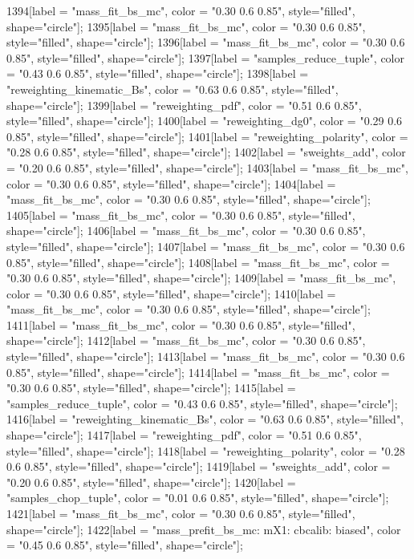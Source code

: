 {	1394[label = "mass_fit_bs_mc", color = "0.30 0.6 0.85", style="filled", shape="circle"];
	1395[label = "mass_fit_bs_mc", color = "0.30 0.6 0.85", style="filled", shape="circle"];
	1396[label = "mass_fit_bs_mc", color = "0.30 0.6 0.85", style="filled", shape="circle"];
	1397[label = "samples_reduce_tuple", color = "0.43 0.6 0.85", style="filled", shape="circle"];
	1398[label = "reweighting_kinematic_Bs", color = "0.63 0.6 0.85", style="filled", shape="circle"];
	1399[label = "reweighting_pdf", color = "0.51 0.6 0.85", style="filled", shape="circle"];
	1400[label = "reweighting_dg0", color = "0.29 0.6 0.85", style="filled", shape="circle"];
	1401[label = "reweighting_polarity", color = "0.28 0.6 0.85", style="filled", shape="circle"];
	1402[label = "sweights_add", color = "0.20 0.6 0.85", style="filled", shape="circle"];
	1403[label = "mass_fit_bs_mc", color = "0.30 0.6 0.85", style="filled", shape="circle"];
	1404[label = "mass_fit_bs_mc", color = "0.30 0.6 0.85", style="filled", shape="circle"];
	1405[label = "mass_fit_bs_mc", color = "0.30 0.6 0.85", style="filled", shape="circle"];
	1406[label = "mass_fit_bs_mc", color = "0.30 0.6 0.85", style="filled", shape="circle"];
	1407[label = "mass_fit_bs_mc", color = "0.30 0.6 0.85", style="filled", shape="circle"];
	1408[label = "mass_fit_bs_mc", color = "0.30 0.6 0.85", style="filled", shape="circle"];
	1409[label = "mass_fit_bs_mc", color = "0.30 0.6 0.85", style="filled", shape="circle"];
	1410[label = "mass_fit_bs_mc", color = "0.30 0.6 0.85", style="filled", shape="circle"];
	1411[label = "mass_fit_bs_mc", color = "0.30 0.6 0.85", style="filled", shape="circle"];
	1412[label = "mass_fit_bs_mc", color = "0.30 0.6 0.85", style="filled", shape="circle"];
	1413[label = "mass_fit_bs_mc", color = "0.30 0.6 0.85", style="filled", shape="circle"];
	1414[label = "mass_fit_bs_mc", color = "0.30 0.6 0.85", style="filled", shape="circle"];
	1415[label = "samples_reduce_tuple", color = "0.43 0.6 0.85", style="filled", shape="circle"];
	1416[label = "reweighting_kinematic_Bs", color = "0.63 0.6 0.85", style="filled", shape="circle"];
	1417[label = "reweighting_pdf", color = "0.51 0.6 0.85", style="filled", shape="circle"];
	1418[label = "reweighting_polarity", color = "0.28 0.6 0.85", style="filled", shape="circle"];
	1419[label = "sweights_add", color = "0.20 0.6 0.85", style="filled", shape="circle"];
	1420[label = "samples_chop_tuple", color = "0.01 0.6 0.85", style="filled", shape="circle"];
	1421[label = "mass_fit_bs_mc", color = "0.30 0.6 0.85", style="filled", shape="circle"];
	1422[label = "mass_prefit_bs_mc\nmassbin: mX1\nmassmodel: cbcalib\ntrigger: biased", color = "0.45 0.6 0.85", style="filled", shape="circle"];
}

